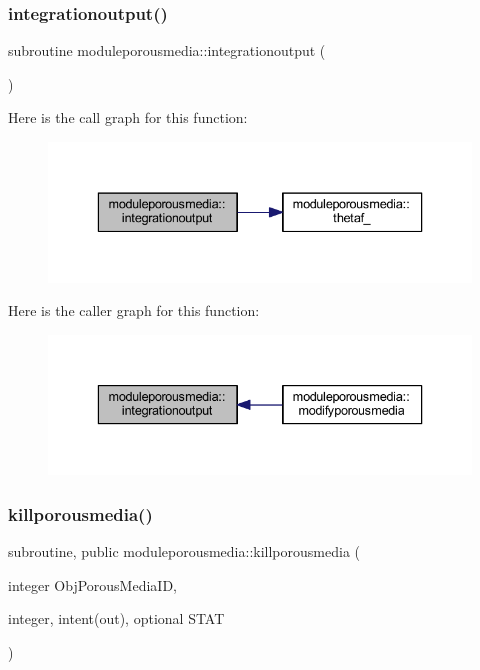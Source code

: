 \subsubsection{\texorpdfstring{integrationoutput()}{integrationoutput()}}
{\footnotesize\ttfamily subroutine moduleporousmedia\+::integrationoutput (\begin{DoxyParamCaption}{ }\end{DoxyParamCaption})\hspace{0.3cm}{\ttfamily [private]}}

Here is the call graph for this function\+:\nopagebreak
\begin{figure}[H]
\begin{center}
\leavevmode
\includegraphics[width=336pt]{namespacemoduleporousmedia_a349fd0e731f948138864367a533ec7aa_cgraph}
\end{center}
\end{figure}
Here is the caller graph for this function\+:\nopagebreak
\begin{figure}[H]
\begin{center}
\leavevmode
\includegraphics[width=336pt]{namespacemoduleporousmedia_a349fd0e731f948138864367a533ec7aa_icgraph}
\end{center}
\end{figure}
\mbox{\label{namespacemoduleporousmedia_a0935fa1b37d6d9dcbd156944ae27cbe3}} 
\subsubsection{\texorpdfstring{killporousmedia()}{killporousmedia()}}
{\footnotesize\ttfamily subroutine, public moduleporousmedia\+::killporousmedia (\begin{DoxyParamCaption}\item[{integer}]{Obj\+Porous\+Media\+ID,  }\item[{integer, intent(out), optional}]{S\+T\+AT }\end{DoxyParamCaption})}


